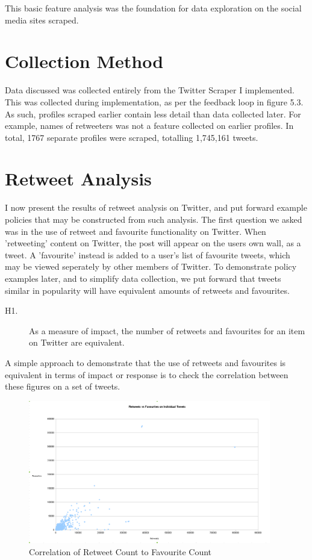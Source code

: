 This basic feature analysis was the foundation for data exploration on the social media sites scraped. 

\section{Collection Method}

Data discussed was collected entirely from the Twitter Scraper I implemented. This was collected during implementation, as per the feedback loop in figure 5.3. As such, profiles scraped earlier contain less detail than data collected later. For example, names of retweeters was not a feature collected on earlier profiles. In total, 1767 separate profiles were scraped, totalling 1,745,161 tweets. 


\section{Retweet Analysis}

I now present the results of retweet analysis on Twitter, and put forward example policies that may be constructed from such analysis. The first question we asked was in the use of retweet and favourite functionality on Twitter. When 'retweeting' content on Twitter, the post will appear on the users own wall, as a tweet. A 'favourite' instead is added to a user's list of favourite tweets, which may be viewed seperately by other members of Twitter. To demonstrate policy examples later, and to simplify data collection, we put forward that tweets similar in popularity will have equivalent amounts of retweets and favourites. 

\begin{description}
 \item [H1.]{As a measure of impact, the number of retweets and favourites for an item on Twitter are equivalent.}
\end{description}

A simple approach to demonstrate that the use of retweets and favourites is equivalent in terms of impact or response is to check the correlation between these figures on a set of tweets. 

\begin{figure}[h!]
\centering
\includegraphics[width=400px]{Images/retweets_vs_favourites.pdf}
\caption{Correlation of Retweet Count to Favourite Count}
\end{figure}


